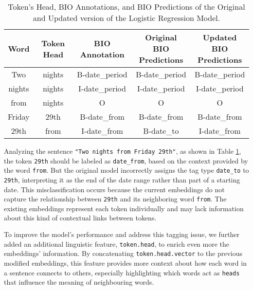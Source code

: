\documentclass[11pt,a4paper]{article}
\begin{document}
\begin{table}[h!]     \centering     \begin{tabular}{|c|c|c|c|c|}         \hline         
\textbf{Word} & \textbf{Token Head} & \textbf{BIO Annotation} & \makecell{\textbf{Original} \\ \textbf{BIO Predictions}} & \makecell{\textbf{Updated} \\ \textbf{BIO Predictions}} \\
\hline  
Two & nights & B-date\_period & B-date\_period & B-date\_period\\
       
nights & nights & I-date\_period & I-date\_period & I-date\_period\\
      
from & nights & O & O & O\\ 
       
Friday & 29th & B-date\_from & B-date\_from & B-date\_from\\
       
29th & from & I-date\_from & B-date\_to & I-date\_from\\
\hline     \end{tabular}     \caption{Token's Head, BIO Annotations, and BIO Predictions of the Original and Updated version of the Logistic Regression Model.} 
\label{tab_head}
\end{table}

Analyzing the sentence \texttt{"Two nights from Friday 29th"}, as shown in Table \ref{tab_head}, the token \texttt{29th} should be labeled as \texttt{date\_from}, based on the context provided by the word \texttt{from}. But the original model incorrectly assigns the tag type \texttt{date\_to} to \texttt{29th}, interpreting it as the end of the date range rather than part of a starting date. This misclassification occurs because the current embeddings do not capture the relationship between \texttt{29th} and its neighboring word \texttt{from}.
The existing embeddings represent each token individually and may lack information about this kind of contextual links between tokens.

To improve the model's performance and address this tagging issue, we further added an additional linguistic feature, \texttt{token.head}, to enrich even more the embeddings' information. By concatenating \texttt{token.head.vector} to the previous modified embeddings, this feature provides more context about how each word in a sentence connects to others, especially highlighting which words act as \texttt{heads} that influence the meaning of neighbouring words.
\end{document}
